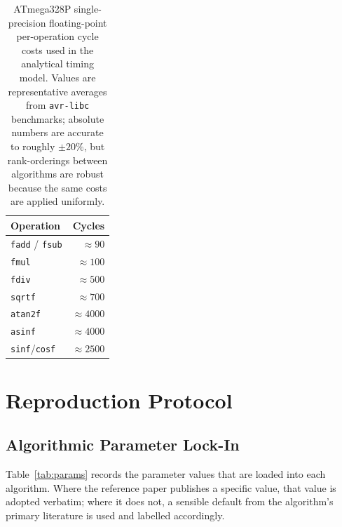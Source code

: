 \documentclass[conference]{IEEEtran}
\begin{document}
\begin{table}[t]
\caption{ATmega328P single-precision floating-point per-operation
cycle costs used in the analytical timing model. Values are
representative averages from \texttt{avr-libc} benchmarks; absolute
numbers are accurate to roughly $\pm 20\%$, but rank-orderings
between algorithms are robust because the same costs are applied
uniformly.}
\label{tab:cycles}
\centering
\renewcommand{\arraystretch}{1.1}
\begin{tabular}{@{}lr@{}}
\toprule
Operation & Cycles \\
\midrule
\texttt{fadd} / \texttt{fsub} & $\approx 90$ \\
\texttt{fmul}                 & $\approx 100$ \\
\texttt{fdiv}                 & $\approx 500$ \\
\texttt{sqrtf}                & $\approx 700$ \\
\texttt{atan2f}               & $\approx 4000$ \\
\texttt{asinf}                & $\approx 4000$ \\
\texttt{sinf}/\texttt{cosf}   & $\approx 2500$ \\
\bottomrule
\end{tabular}
\end{table}

\section{Reproduction Protocol}\label{sec:protocol}

\subsection{Algorithmic Parameter Lock-In}

Table~\ref{tab:params} records the parameter values that are
loaded into each algorithm. Where the reference paper publishes a
specific value, that value is adopted verbatim; where it does not,
a sensible default from the algorithm's primary literature is used
and labelled accordingly.
\end{document}

